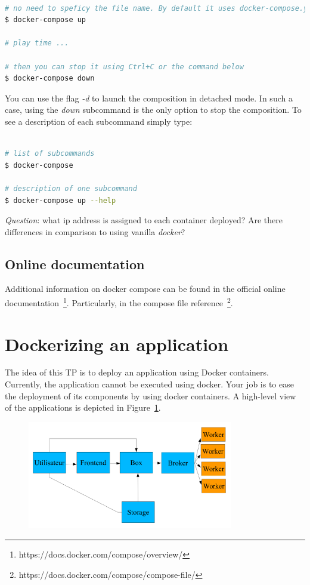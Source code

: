 \documentclass[a4paper,11pt]{exam}
\begin{document}
\begin{lstlisting}[frame=single,language={sh}] % Start your code-block

# no need to speficy the file name. By default it uses docker-compose.yml.
$ docker-compose up

# play time ...

# then you can stop it using Ctrl+C or the command below
$ docker-compose down

\end{lstlisting}

You can use the flag \textit{-d} to launch the composition in detached mode. In such a case, using the \textit{down} subcommand is the only option to stop the composition. 
To see a description of each subcommand simply type:

\begin{lstlisting}[frame=single,language={sh}] % Start your code-block

# list of subcommands
$ docker-compose

# description of one subcommand
$ docker-compose up --help

\end{lstlisting}

\textit{Question}: what ip address is assigned to each container deployed? Are there differences in comparison to using vanilla \textit{docker}?

\subsection{Online documentation}

Additional information on docker compose can be found in the official online documentation~\footnote{https://docs.docker.com/compose/overview/}. Particularly,  in the compose file reference~\footnote{https://docs.docker.com/compose/compose-file/}.

\section{Dockerizing an application}

The idea of this TP is to deploy an application using Docker containers.
Currently, the application cannot be executed using docker. Your job is to ease the deployment of its components by using docker containers.
A high-level view of the applications is depicted in Figure~\ref{fig:architecture}.

\begin{figure}[!ht]
	\centering
	\includegraphics[width=0.8\textwidth]{fig/architecture.png}
	\label{fig:architecture}
\end{figure}
\end{document}
